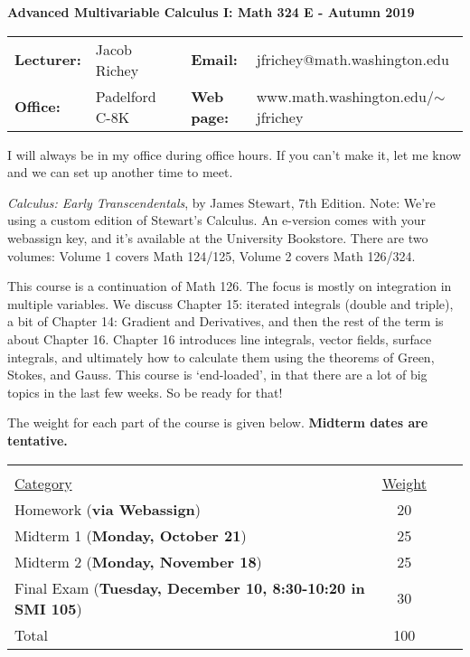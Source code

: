 \documentclass[11 pt]{report}
\begin{document}
\centerline{\bf Advanced Multivariable Calculus I: Math 324 E - Autumn 2019}
\vspace{0.2cm}
\begin{tabular}{lllll}
{\bf Lecturer: }    & Jacob Richey &  & {\bf Email: }       & jfrichey@math.washington.edu \\
{\bf Office: }      & Padelford C-8K        &  & {\bf Web page: }    & www.math.washington.edu/$\sim$jfrichey \\
\end{tabular}
\vspace{0.25cm}

I will always be in my office during office hours. If you can't make it, let me know and we can set up another time to meet.  \vspace{0.25cm}

 \emph{Calculus: Early Transcendentals}, by James Stewart, 7th
Edition. Note: We're using a custom edition of Stewart's Calculus. An e-version comes with 
your webassign key, and it's available at the University Bookstore.  There are two volumes:
Volume 1 covers Math 124/125, Volume 2 covers Math 126/324. 

\vspace{0.25cm}

  This course is a continuation of
Math 126.  The focus is mostly on integration in multiple variables.
We discuss Chapter 15: iterated integrals (double and triple), a bit
of Chapter 14: Gradient and Derivatives, and then the rest of the
term is about Chapter 16.  Chapter 16 introduces line integrals,
vector fields, surface integrals, and ultimately how to calculate
them using the theorems of Green, Stokes, and Gauss.  This course is
`end-loaded', in that there are a lot of big topics in the last few
weeks.  So be ready for that!

\vspace{0.25cm}

 The weight for each part of the course is given
below. \textbf{Midterm dates are tentative.}

\vspace{-.25in}

\begin{center}\begin{tabular}{lccl} &  \\
\underline{Category} & \underline{Weight}  \\
Homework   ({\bf via Webassign})                 & 20  \\
Midterm 1  ({\bf Monday, October 21})                   & 25  \\
Midterm 2  ({\bf Monday, November 18})                   & 25   \\
Final Exam ({\bf Tuesday, December 10, 8:30-10:20 in SMI 105})                        & 30  \\
\hline Total                                        & 100
\end{tabular}
\end{center}
\end{document}
